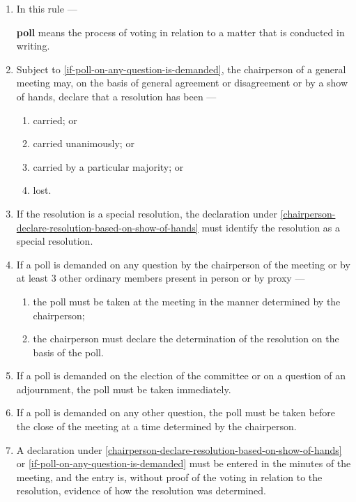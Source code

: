 \documentclass[../constitution.tex]{subfiles}
\begin{document}
\begin{enumerate}

\item In this rule ---
  
  \textbf{poll} means the process of voting in relation to a matter that is conducted in writing.

\item Subject to  \ref{if-poll-on-any-question-is-demanded}, the chairperson of a general meeting may, on the basis of general agreement or disagreement or by a show of hands, declare that a resolution has been --- \label{chairperson-declare-resolution-based-on-show-of-hands}

  \begin{enumerate}
  
  \item carried; or
  \item carried unanimously; or
  \item carried by a particular majority; or
  \item lost.
  \end{enumerate}
\item If the resolution is a special resolution, the declaration under  \ref{chairperson-declare-resolution-based-on-show-of-hands} must identify the resolution as a special resolution.
\item If a poll is demanded on any question by the chairperson of the meeting or by at least 3 other ordinary members present in person or by proxy --- \label{if-poll-on-any-question-is-demanded}

  \begin{enumerate}
  
  \item the poll must be taken at the meeting in the manner determined by the chairperson;
  \item the chairperson must declare the determination of the resolution on the basis of the poll.
  \end{enumerate}
\item If a poll is demanded on the election of the committee or on a question of an adjournment, the poll must be taken immediately.
\item If a poll is demanded on any other question, the poll must be taken before the close of the meeting at a time determined by the chairperson.
\item A declaration under  \ref{chairperson-declare-resolution-based-on-show-of-hands} or \ref{if-poll-on-any-question-is-demanded} must be entered in the minutes of the meeting, and the entry is, without proof of the voting in relation to the resolution, evidence of how the resolution was determined.
\end{enumerate}
\end{document}
